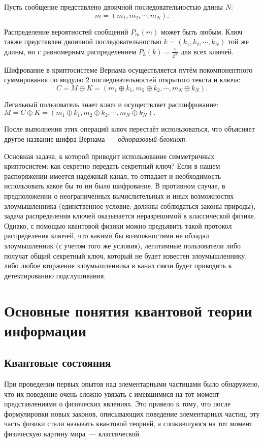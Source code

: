 Пусть сообщение представлено двоичной последовательностью длины $N$:
$$ m = (m_1, m_2, \cdots, m_N). $$

Распределение вероятностей сообщений $P_m(m)$ может быть любым. Ключ также представлен двоичной последовательностью $k =
(k_1, k_2, \cdots, k_N )$ той же длины, но с равномерным распределением $P_k(k) = \frac{1}{2^N}$
для всех ключей.

Шифрование в криптосистеме Вернама осуществляется путём покомпонентного суммирования по модулю 2 последовательностей открытого текста и ключа:
$$C = M \oplus K = (m_1 \oplus k_1, m_2 \oplus k_2, \cdots, m_N \oplus k_N ).$$

Легальный пользователь знает ключ и осуществляет расшифрование:
$M = C \oplus K = (m_1 \oplus k_1, m_2 \oplus k_2, \cdots, m_N \oplus k_N ).$

После выполнения этих операций ключ перестаёт использоваться, что объясняет другое название шифра Вернама~--- \textit{одноразовый блокнот}. 

Основная задача, к которой приводит использование симметричных криптосистем: как секретно передать секретный ключ?
Если в нашем распоряжении имеется надёжный канал, то отпадает и необходимость использовать какое бы то ни было шифрование.
В противном случае, в предположении о неограниченных вычислительных и иных возможностях злоумышленника (единственное условие: должны соблюдаться законы природы),
задача распределения ключей оказывается неразрешимой в классической физике. Однако, с помощью квантовой физики можно предъявить такой протокол распределения ключей, 
что какими бы возможностями не обладал злоумышленник (с учетом того же условия), легитимные пользователи либо получат общий секретный ключ, который не будет известен злоумышленнику,
либо любое вторжение злоумышленника в канал связи будет приводить к детектированию подслушивания.

\section{Основные понятия квантовой теории информации}
\subsection{Квантовые состояния}
При проведении первых опытов над элементарными частицами было обнаружено, что их поведение очень сложно увязать с имевшимися на тот момент представлениями о физических явлениях. Это привело к тому, что после формулировки новых законов, описывающих поведение элементарных частиц, эту часть физики стали называть квантовой теорией, а сложившуюся на тот момент физическую картину мира~--- классической.

